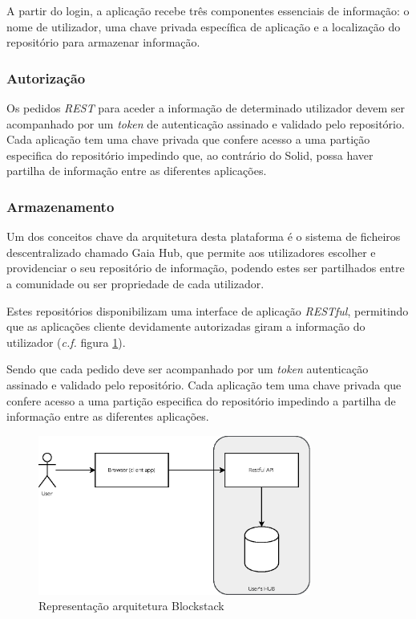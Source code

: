 A partir do login, a aplicação recebe três componentes essenciais de informação: o nome de utilizador, uma chave privada específica de aplicação e a localização do repositório para armazenar informação\cite{blockstack_white_paper}.

\subsubsection{Autorização}
Os pedidos \emph{REST} para aceder a informação de determinado utilizador devem ser acompanhado por um \emph{token} de autenticação assinado e validado pelo repositório. Cada aplicação tem uma chave privada que confere acesso a uma partição especifica do repositório impedindo que, ao contrário do Solid, possa haver partilha de informação entre as diferentes aplicações.

\subsubsection{Armazenamento}

Um dos conceitos chave da arquitetura desta plataforma é o sistema de ficheiros descentralizado chamado Gaia Hub, que permite aos utilizadores escolher e providenciar o seu repositório de informação, podendo estes ser partilhados entre a comunidade ou ser propriedade de cada utilizador.

Estes repositórios disponibilizam uma interface de aplicação \emph{RESTful}, permitindo que as aplicações cliente devidamente autorizadas giram a informação do utilizador (\emph{c.f.} figura \ref{estado_arte_representacao_blockstack}).

Sendo que cada pedido deve ser acompanhado por um \emph{token} autenticação assinado e validado pelo repositório. Cada aplicação tem uma chave privada que confere acesso a uma partição especifica do repositório impedindo a partilha de informação entre as diferentes aplicações\cite{blockstack_white_paper}.

\begin{figure}[H]
    \begin{center}
    \includegraphics[width=0.8\textwidth]{figures/estado_arte-Blockstack.eps}
    \caption{Representação arquitetura Blockstack}
    \label{estado_arte_representacao_blockstack}
    \end{center}
\end{figure}


